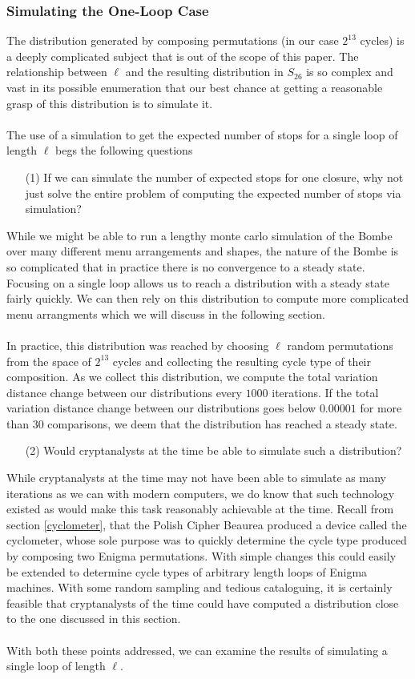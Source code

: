 \subsubsection{Simulating the One-Loop Case}
The distribution generated by composing permutations (in our case $2^{13}$ cycles) is a deeply complicated subject that is out of the scope of this paper. The relationship between $\ell$ and the resulting distribution in $S_{26}$ is so complex and vast in its possible enumeration that our best chance at getting a reasonable grasp of this distribution is to simulate it.
\\\\The use of a simulation to get the expected number of stops for a single loop of length $\ell$ begs the following questions
\begin{enumerate}
	\item[(1)] If we can simulate the number of expected stops for one closure, why not just solve the entire problem of computing the expected number of stops via simulation?
\end{enumerate}
While we might be able to run a lengthy monte carlo simulation of the Bombe over many different menu arrangements and shapes, the nature of the Bombe is so complicated that in practice there is no convergence to a steady state. Focusing on a single loop allows us to reach a distribution with a steady state fairly quickly. We can then rely on this distribution to compute more complicated menu arrangments which we will discuss in the following section.
\\\\In practice, this distribution was reached by choosing $\ell$ random permutations from the space of $2^{13}$ cycles and collecting the resulting cycle type of their composition. As we collect this distribution, we compute the total variation distance change between our distributions every $1000$ iterations. If the total variation distance change between our distributions goes below $0.00001$ for more than $30$ comparisons, we deem that the distribution has reached a steady state.
\begin{enumerate}
	\item[(2)]Would cryptanalysts at the time be able to simulate such a distribution?
\end{enumerate}
While cryptanalysts at the time may not have been able to simulate as many iterations as we can with modern computers, we do know that such technology existed as would make this task reasonably achievable at the time. Recall from section \ref{cyclometer}, that the Polish Cipher Beaurea produced a device called the cyclometer, whose sole purpose was to quickly determine the cycle type produced by composing two Enigma permutations. With simple changes this could easily be extended to determine cycle types of arbitrary length loops of Enigma machines. With some random sampling and tedious cataloguing, it is certainly feasible that cryptanalysts of the time could have computed a distribution close to the one discussed in this section.
\\\\With both these points addressed, we can examine the results of simulating a single loop of length $\ell$.
